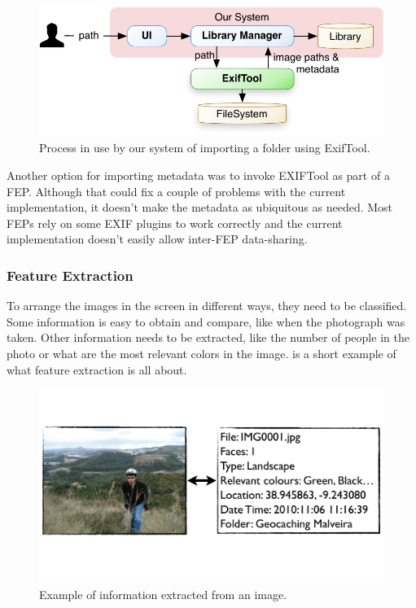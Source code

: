 \begin{figure}[ht]
	\centering
		\includegraphics[scale=0.6]{Figures/import.pdf}
	\caption{Process in use by our system of importing a folder using ExifTool.}
	\label{fig:arch:import}
\end{figure}

Another option for importing metadata was to invoke EXIFTool as part of a \ac{FEP}. Although that could fix a couple of problems with the current  implementation, it doesn’t make the metadata as ubiquitous as needed. Most \acp{FEP} rely on some \ac{EXIF} plugins to work correctly and the current implementation doesn’t easily allow inter-\ac{FEP} data-sharing.





\subsubsection{Feature Extraction} %
\label{ssub:FeatureExtraction}

To arrange the images in the screen in different ways, they need to be classified. Some information is easy to obtain and compare, like when the photograph was taken. Other information needs to be extracted, like the number of people in the photo or what are the most relevant colors in the image.  is a short example of what feature extraction is all about.

\begin{figure}[ht]
	\centering
		\includegraphics[width=0.72\columnwidth]{Figures/fe.pdf}
	\caption{Example of information extracted from an image.}
	\label{fig:fe}
\end{figure}

